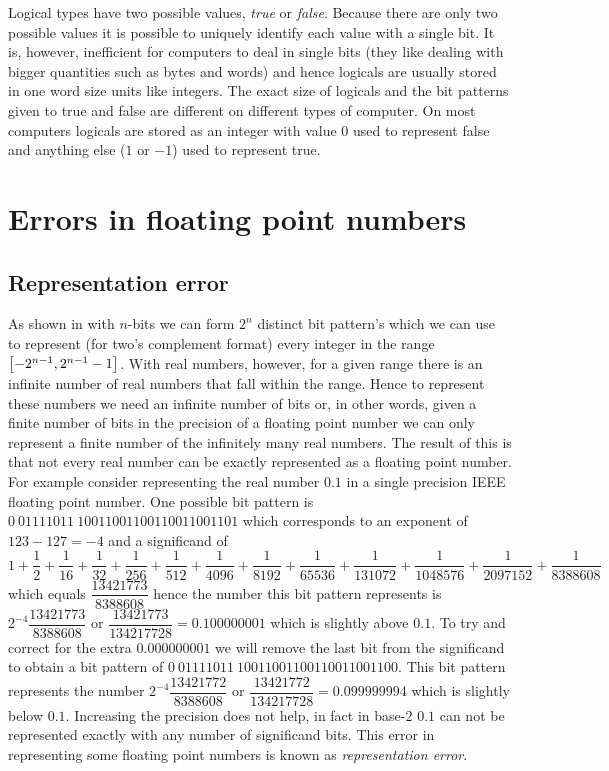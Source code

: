 Logical types have two possible values, \emph{true} or \emph{false}. Because
there are only two possible values it is possible to uniquely identify each
value with a single bit. It is, however, inefficient for computers to deal in
single bits (they like dealing with bigger quantities such as bytes and words)
and hence logicals are usually stored in one word size units like integers.
The exact size of logicals and the bit patterns given to true and false are
different on different types of computer. On most computers logicals are
stored as an integer with value $0$ used to represent false and anything else
(\eg $1$ or $-1$) used to represent true.

\section{Errors in floating point numbers}

\subsection{Representation error}

As shown in  with $n$-bits we can form
$2^{n}$ distinct bit pattern's which we can use to represent (for two's
complement format) every integer in the range $\left[ -2^{n-1},2^{n-1}-1 \right]$.
With real numbers, however, for a given range there is an infinite number of
real numbers that fall within the range. Hence to represent these numbers we
need an infinite number of bits or, in other words, given a finite number of
bits in the precision of a floating point number we can only represent a
finite number of the infinitely many real numbers. The result of this is that
not every real number can be exactly represented as a floating point number.
For example consider representing the real number $0.1$ in a single precision
IEEE floating point number. One possible bit pattern is
$0~01111011~10011001100110011001101$ which corresponds to an exponent of
$123-127=-4$ and a significand of $1+\dfrac{1}{2} + \dfrac{1}{16} +
\dfrac{1}{32} + \dfrac{1}{256} + \dfrac{1}{512} + \dfrac{1}{4096} +
\dfrac{1}{8192} + \dfrac{1}{65536} + \dfrac{1}{131072} + \dfrac{1}{1048576} +
\dfrac{1}{2097152} + \dfrac{1}{8388608}$ which equals
$\dfrac{13421773}{8388608}$ hence the number this bit pattern represents is
$2^{-4}\dfrac{13421773}{8388608}$ or $\dfrac{13421773}{134217728}=0.100000001$
which is slightly above $0.1$. To try and correct for the extra $0.000000001$
we will remove the last bit from the significand to obtain a bit pattern
of $0~01111011~10011001100110011001100$. This bit pattern represents the
number $2^{-4}\dfrac{13421772}{8388608}$ or
$\dfrac{13421772}{134217728}=0.099999994$ which is slightly below $0.1$.
Increasing the precision does not help, in fact in base-$2$ $0.1$ can not be
represented exactly with any number of significand bits. This error in
representing some floating point numbers is known as \emph{representation
  error}.

